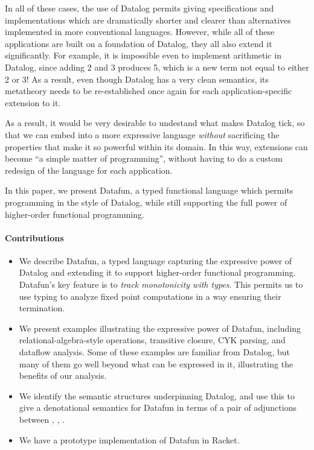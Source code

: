 In all of these cases, the use of Datalog permits giving
specifications and implementations which are dramatically shorter and
clearer than alternatives implemented in more conventional
languages. However, while all of these applications are built on a
foundation of Datalog, they all also extend it significantly. For
example, it is impossible even to implement arithmetic in Datalog,
since adding 2 and 3 produces 5, which is a new term not equal to
either 2 or 3! As a result, even though Datalog has a very clean
semantics, its metatheory needs to be re-established once again for
each application-specific extension to it.

As a result, it would be very desirable to undestand what makes
Datalog tick, so that we can embed into a more expressive language
\emph{without} sacrificing the properties that make it so powerful
within its domain.  In this way, extensions can become ``a simple
matter of programming'', without having to do a custom redesign of the
language for each application.

In this paper, we present Datafun, a typed functional language which
permits programming in the style of Datalog, while still supporting
the full power of higher-order functional programming.

\paragraph{Contributions}
\begin{itemize}
\item We describe Datafun, a typed language capturing the expressive
  power of Datalog and extending it to support higher-order functional
  programming. Datafun's key feature is to \emph{track monotonicity
    with types}. This permits us to use typing to analyze fixed point
  computations in a way ensuring their termination.

\item We present examples illustrating the expressive power of
  Datafun, including relational-algebra-style operations, transitive
  closure, CYK parsing, and dataflow analysis. Some of these examples
  are familiar from Datalog, but many of them go well beyond what can
  be expressed in it, illustrating the benefits of our analysis.

\item We identify the semantic structures underpinning Datalog, and
  use this to give a denotational semantics for Datafun in terms of a
  pair of adjunctions between \cSet{}, \cPoset{}, \cSL{}.

\item We have a prototype implementation of Datafun in Racket. 
\end{itemize}


